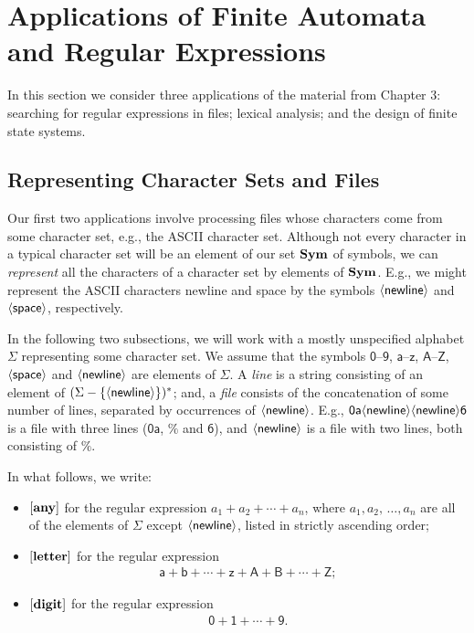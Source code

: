 \section{Applications of Finite Automata and
Regular Expressions}
\label{ApplicationsOfFiniteAutomataAndRegularExpressions}

%

In this section we consider three applications of the material from
Chapter 3: searching for regular expressions in files; lexical
analysis; and the design of finite state systems.

\subsection{Representing Character Sets and Files}

Our first two applications involve processing files whose characters
come from some character set, e.g., the ASCII character set.  Although
not every character in a typical character set will be an element of
our set $\mathbf{Sym}$ of symbols, we can \emph{represent} all the characters
of a character set by elements of $\mathbf{Sym}$.  E.g., we might represent
the ASCII characters newline and space by the symbols $\mathsf{\langle newline\rangle}$
and $\mathsf{\langle space\rangle}$, respectively.

In the following two subsections, we will work with a mostly
unspecified alphabet $\Sigma$ representing some character set.  We
assume that the symbols $\mathsf{0}$--$\mathsf{9}$,
$\mathsf{a}$--$\mathsf{z}$, $\mathsf{A}$--$\mathsf{Z}$, $\mathsf{\langle space\rangle}$
and $\mathsf{\langle newline\rangle}$ are elements of $\Sigma$.  A \emph{line} is a string
consisting of an element of $(\Sigma-\{\mathsf{\langle newline\rangle}\})^*$; and, a
\emph{file} consists of the concatenation of some number of lines,
separated by occurrences of $\mathsf{\langle newline\rangle}$.  E.g.,
$\mathsf{0a\mathsf{\langle newline\rangle}\mathsf{\langle newline\rangle} 6}$ is a file with three lines
($\mathsf{0a}$, $\mathsf{\%}$ and $\mathsf{6}$), and
$\mathsf{\mathsf{\langle newline\rangle}}$ is a file with two lines, both consisting of
$\%$.

In what follows, we write:
\begin{itemize}
\item $[\mathbf{any}]$ for the regular expression $a_1+a_2+\cdots+a_n$, where
  $a_1,a_2,\,\ldots,a_n$ are all of the elements of $\Sigma$ except
  $\mathsf{\langle newline\rangle}$, listed in strictly ascending order;

\item $[\mathbf{letter}]$ for the regular expression
  \begin{gather*}
    \mathsf{a + b + \cdots + z + A + B + \cdots + Z};
  \end{gather*}

\item $[\mathbf{digit}]$ for the regular expression
  \begin{gather*}
    \mathsf{0 + 1 + \cdots + 9}.
  \end{gather*}
\end{itemize}

